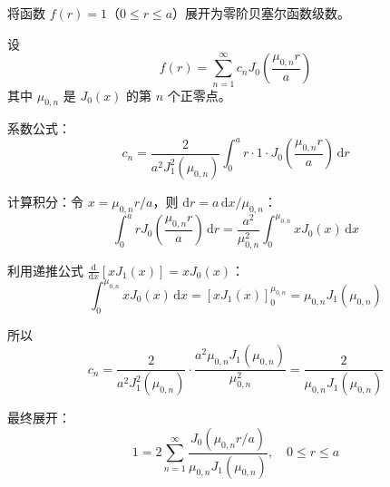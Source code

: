 \begin{lizi}{}{}
将函数 $f(r) = 1$（$0 \leq r \leq a$）展开为零阶贝塞尔函数级数。

\begin{jie}
    设
    \begin{equation}
        f(r) = \sum_{n=1}^{\infty} c_n J_0\left(\frac{\mu_{0,n}r}{a}\right)
    \end{equation}
    其中 $\mu_{0,n}$ 是 $J_0(x)$ 的第 $n$ 个正零点。
    
    系数公式：
    \begin{equation}
        c_n = \frac{2}{a^2 J_1^2(\mu_{0,n})}\int_0^a r \cdot 1 \cdot J_0\left(\frac{\mu_{0,n}r}{a}\right)\,\mathrm{d}r
    \end{equation}
    
    计算积分：令 $x = \mu_{0,n}r/a$，则 $\mathrm{d}r = a\,\mathrm{d}x/\mu_{0,n}$：
    \begin{equation}
        \int_0^a r J_0\left(\frac{\mu_{0,n}r}{a}\right)\,\mathrm{d}r = \frac{a^2}{\mu_{0,n}^2}\int_0^{\mu_{0,n}} x J_0(x)\,\mathrm{d}x
    \end{equation}
    
    利用递推公式 $\frac{\mathrm{d}}{\mathrm{d}x}[x J_1(x)] = x J_0(x)$：
    \begin{equation}
        \int_0^{\mu_{0,n}} x J_0(x)\,\mathrm{d}x = [x J_1(x)]_0^{\mu_{0,n}} = \mu_{0,n} J_1(\mu_{0,n})
    \end{equation}
    
    所以
    \begin{equation}
        c_n = \frac{2}{a^2 J_1^2(\mu_{0,n})} \cdot \frac{a^2 \mu_{0,n} J_1(\mu_{0,n})}{\mu_{0,n}^2} = \frac{2}{\mu_{0,n} J_1(\mu_{0,n})}
    \end{equation}
    
    最终展开：
    \begin{equation}
        \boxed{1 = 2\sum_{n=1}^{\infty} \frac{J_0(\mu_{0,n}r/a)}{\mu_{0,n} J_1(\mu_{0,n})}, \quad 0 \leq r \leq a}
    \end{equation}
\end{jie}
\end{lizi}

